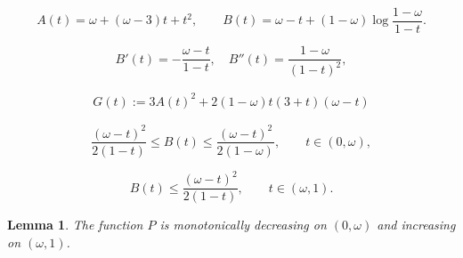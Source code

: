 \documentclass[10pt,a4paper]{amsart}
\newtheorem{lemma}{Lemma}
\begin{document}
\begin{equation}\label{AB}
A(t) = \omega + (\omega-3) t + t^2, \qquad 
B(t) = \omega-t + (1 - \omega) \log \frac{1-\omega}{1 - t}.
\end{equation}

\begin{equation}
\label{der-B}
B'(t) = -\frac{\omega - t}{1-t}, \quad B''(t) = \frac{1-\omega}{(1-t)^2},
\end{equation}	

\begin{align}
G(t) := 3A(t)^2 +  2  (1-\omega) t (3 + t) (\omega - t) \label{G-def}
\end{align}

	\begin{equation}\label{B1}
	\frac{(\omega - t)^2}{2(1-t)} \leq B(t) \leq \frac{(\omega - t)^2}{2(1-\omega)}, \quad \quad  t\in (0,\omega), 
	\end{equation}

	\begin{equation}\label{B2}
	B(t) \leq \frac{(\omega - t)^2}{2(1-t)}, \quad \quad t\in (\omega, 1). 
	\end{equation} 

\begin{lemma}\label{lemma3}
	The function $P$ is monotonically decreasing on $(0,\omega)$ and  increasing on $(\omega,1)$. 
\end{lemma}
\end{document}
